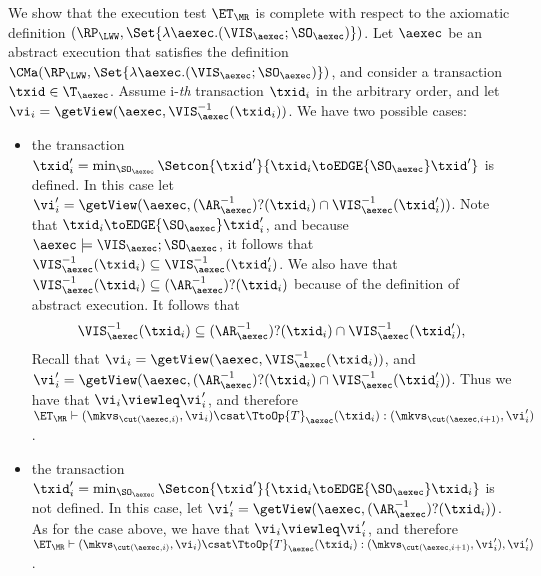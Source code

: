 We show that the execution test $\ET_{\MR}$ is complete 
with respect to the axiomatic definition $(\RP_{\LWW}, \Set{\lambda \aexec.(\VIS_{\aexec};\SO_{\aexec})})$. 
Let $\aexec$ be an abstract execution that satisfies the definition
$\CMa(\RP_{\LWW}, \Set{\lambda \aexec.(\VIS_{\aexec};\SO_{\aexec})})$, 
and consider a transaction $\txid \in \T_{\aexec}$. 
Assume i-\emph{th} transaction \( \txid_i \) in the arbitrary order,
and let $\vi_i = \getView(\aexec, \VIS^{-1}_{\aexec}(\txid_{i}))$.
We have two possible cases: 
\begin{itemize}
    \item the transaction $\txid'_{i} = \min_{\SO_{\aexec}}\Setcon{\txid' }{ \txid_{i} \toEDGE{\SO_{\aexec}} \txid'}$ is 
defined. In this case let $\vi'_{i} =\getView(\aexec, (\AR^{-1}_{\aexec})?(\txid_{i}) \cap \VIS^{-1}_{\aexec}(\txid'_{i}))$. 
Note that $\txid_{i} \toEDGE{\SO_{\aexec}} \txid'_{i}$, and because $\aexec \models \VIS_{\aexec} ; \SO_{\aexec}$, 
it follows that $\VIS^{-1}_{\aexec}(\txid_{i}) \subseteq \VIS^{-1}_{\aexec}(\txid'_{i})$. 
We also have that $\VIS^{-1}_{\aexec}(\txid_{i}) \subseteq (\AR^{-1}_{\aexec})?(\txid_{i})$ because of 
the definition of abstract execution. It follows that 
\[
\VIS^{-1}_{\aexec}(\txid_{i}) \subseteq (\AR^{-1}_{\aexec})?(\txid_{i}) \cap \VIS^{-1}_{\aexec}(\txid'_{i}),
\]
Recall that  $\vi_i = \getView(\aexec, \VIS^{-1}_{\aexec}(\txid_{i}))$, 
and $\vi'_{i} =\getView(\aexec, (\AR^{-1}_{\aexec})?(\txid_{i}) \cap \VIS^{-1}_{\aexec}(\txid'_{i}))$. 
Thus we have that $\vi_i \viewleq \vi'_{i}$, and therefore $\ET_{\MR} \vdash (\mkvs_{\cut(\aexec, i)}, \vi_i) 
\csat \TtoOp{T}_{\aexec}(\txid_{i}) : (\mkvs_{\cut(\aexec, i+1)},\vi'_{i})$. 
\item the transaction $\txid'_{i} = \min_{\SO_{\aexec}}\Setcon{\txid' }{ \txid_{i} \toEDGE{\SO_{\aexec}} \txid_{i}}$ 
is not defined. In this case, let $\vi'_{i} = \getView(\aexec, (\AR^{-1}_{\aexec})?(\txid_{i}))$. 
As for the case above, we have that $\vi_i \viewleq \vi'_{i}$, and therefore 
$\ET_{\MR} \vdash (\mkvs_{\cut(\aexec, i)}, \vi_i) \csat \TtoOp{T}_{\aexec}(\txid_{i}) : (\mkvs_{\cut(\aexec, i+1)},\vi'_{i}),\vi'_{i})$. 
\end{itemize}
